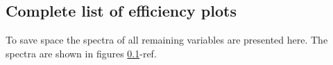 \subsection{Complete list of efficiency plots}

To save space the spectra of all remaining variables are presented here.  The spectra are shown in figures \ref{}-ref{}.


\clearpage

